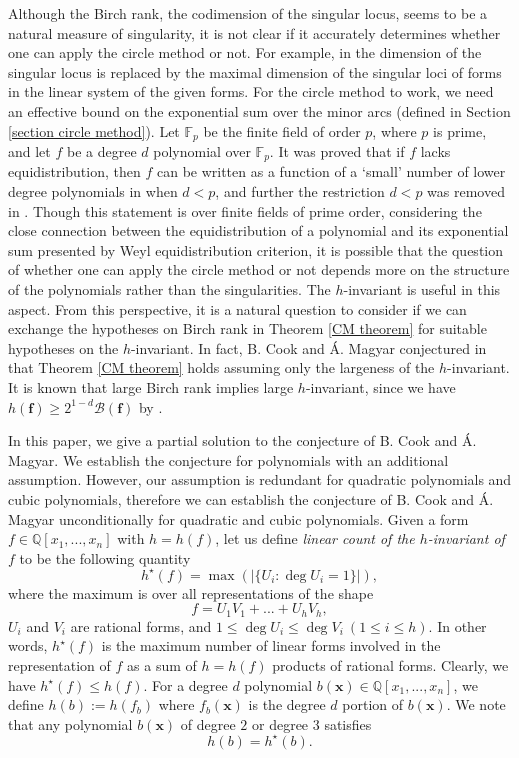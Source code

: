 \documentclass[12pt]{amsart}
\theoremstyle{definition}
\theoremstyle{remark}
\numberwithin{equation}{section}
\begin{document}
Although the Birch rank, the codimension of the singular locus, seems to be a natural measure of singularity, it is not clear if it accurately determines whether one can apply the circle method or not. For example, in \cite{DamS} the dimension of the singular locus
is replaced by the maximal dimension of the singular loci of forms in the linear system of the given forms.
For the circle method to work, we need an effective bound on the exponential sum over the minor arcs (defined in Section \ref{section circle method}). Let $\mathbb{F}_p$ be the finite field of order $p$, where $p$ is prime, and let $f$ be a degree $d$ polynomial over $\mathbb{F}_p$. It was proved that if $f$ lacks equidistribution, then $f$ can be written as a function of a `small' number of lower degree polynomials in \cite{GT1} when $d < p$, and further the restriction $d< p$ was removed in \cite{KL}.
Though this statement is over finite fields of prime order,
considering the close connection between the equidistribution of a polynomial and its exponential sum presented by Weyl equidistribution criterion,
it is possible that the question of whether one can apply the circle method or not depends more on the structure of the polynomials rather than the singularities. The $h$-invariant is useful in this aspect.
From this perspective, it is a natural question to consider if we can exchange the hypotheses on Birch rank in Theorem \ref{CM theorem}
for suitable hypotheses on the $h$-invariant.
In fact, B. Cook and \'{A}. Magyar conjectured in \cite[pp. 736]{CM} that Theorem \ref{CM theorem} holds assuming only the largeness of the $h$-invariant.
It is known that large Birch rank implies large $h$-invariant, since we have
$h(\mathbf{f})\geq 2^{1-d} \mathcal{B}(\mathbf{f})$ by \cite[Lemma 16.1, (10.3), (10.5), (17.1)]{S}.

In this paper, we give a partial solution to the conjecture of B. Cook and \'{A}. Magyar. We establish the conjecture for polynomials with an additional assumption. However, our assumption is redundant for quadratic polynomials and cubic polynomials, therefore we can establish the conjecture of B. Cook and \'{A}. Magyar unconditionally for quadratic and cubic polynomials.
Given a form $f \in \mathbb{Q}[x_1, ..., x_n]$ with $h = h(f)$, let us define \textit{linear count of the $h$-invariant of $f$} to be
the following quantity
$$
h^{\star}(f) = \max ( |\{ U_i  : \deg U_i = 1 \}| ),
$$
where the maximum is over all representations of the shape
$$
f = U_1 V_1 + ... + U_h V_h,
$$
$U_i$ and $V_i$ are rational forms, and $1 \leq \deg U_i \leq \deg V_i \ (1 \leq i \leq h)$.
In other words, $h^{\star}(f)$ is the maximum number of linear forms involved
in the representation of $f$ as a sum of $h = h(f)$ products of rational forms.
Clearly, we have $h^{\star}(f) \leq h(f).$
For a degree $d$ polynomial $b(\mathbf{x}) \in \mathbb{Q}[x_1, ..., x_n]$, we define $h(b):=h(f_b)$
where $f_b(\mathbf{x})$ is the degree $d$ portion of $b(\mathbf{x})$.
We note that any polynomial $b(\mathbf{x})$ of degree $2$ or degree $3$ satisfies
$$
h(b) = h^{\star}(b).
$$
\end{document}
